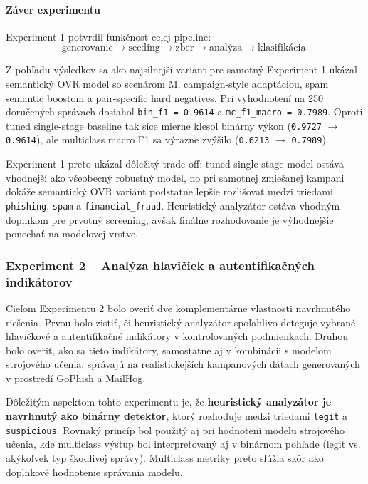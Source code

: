 \documentclass[conference]{IEEEtran}
\begin{document}
\paragraph{Záver experimentu}

Experiment 1 potvrdil funkčnosť celej pipeline:
\[
\text{generovanie} \rightarrow \text{seeding} \rightarrow \text{zber} \rightarrow \text{analýza} \rightarrow \text{klasifikácia}.
\]

Z pohľadu výsledkov sa ako najsilnejší variant pre samotný Experiment 1 ukázal semantický OVR model so scenárom M, campaign-style adaptáciou, spam semantic boostom a pair-specific hard negatives. Pri vyhodnotení na 250 doručených správach dosiahol \texttt{bin\_f1 = 0.9614} a \texttt{mc\_f1\_macro = 0.7989}. Oproti tuned single-stage baseline tak síce mierne klesol binárny výkon (\texttt{0.9727} $\rightarrow$ \texttt{0.9614}), ale multiclass macro F1 sa výrazne zvýšilo (\texttt{0.6213} $\rightarrow$ \texttt{0.7989}).

Experiment 1 preto ukázal dôležitý trade-off: tuned single-stage model ostáva vhodnejší ako všeobecný robustný model, no pri samotnej zmiešanej kampani dokáže semantický OVR variant podstatne lepšie rozlišovať medzi triedami \texttt{phishing}, \texttt{spam} a \texttt{financial\_fraud}. Heuristický analyzátor ostáva vhodným doplnkom pre prvotný screening, avšak finálne rozhodovanie je výhodnejšie ponechať na modelovej vrstve.

\subsubsection{Experiment 2 – Analýza hlavičiek a autentifikačných indikátorov}\label{epx2}

Cieľom Experimentu 2 bolo overiť dve komplementárne vlastnosti navrhnutého riešenia. 
Prvou bolo zistiť, či heuristický analyzátor spoľahlivo deteguje vybrané hlavičkové a autentifikačné indikátory v kontrolovaných podmienkach. Druhou bolo overiť, ako sa tieto indikátory, samostatne aj v kombinácii s modelom strojového učenia, správajú na realistickejších kampanových dátach generovaných v prostredí GoPhish a MailHog.

Dôležitým aspektom tohto experimentu je, že \textbf{heuristický analyzátor je navrhnutý ako binárny detektor}, ktorý rozhoduje medzi triedami \texttt{legit} a \texttt{suspicious}. Rovnaký princíp bol použitý aj pri hodnotení modelu strojového učenia, kde multiclass výstup bol interpretovaný aj v binárnom pohľade (legit vs. akýkoľvek typ škodlivej správy). Multiclass metriky preto slúžia skôr ako doplnkové hodnotenie správania modelu.
\end{document}
